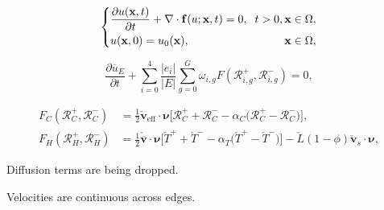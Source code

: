 \documentclass[usenames,dvipsnames,letterpaper,landscape,final]{slides}
\begin{document}
\begin{myslide}
\begin{equation*}\label{eq:conservationlaw}
		  \left \{
		  \begin{alignedat}{2}
					 &\frac{\partial u(\mathbf{x},t)}{\partial t} + \nabla \cdot \mathbf{f}(u; \mathbf{x},t) = 0, \hspace{0.2cm} t>0,\, &&\mathbf{x} \in \Omega, \\ 
					 &u(\mathbf{x},0) = u_0(\mathbf{x}), \hspace{2.5cm} &&\mathbf{x} \in \Omega,
		  \end{alignedat}
		  \right .
\end{equation*}

\begin{equation*}\label{eq:fvdis}
		  \frac{\partial \overline{u}_{E}}{\partial t} + \sum_{i=0}^4\frac{\lvert e_i \rvert}{\lvert E \rvert}
		  \sum_{g=0}^G \omega_{i,g} F(\mathcal{R}_{i,g}^+, \mathcal{R}_{i,g}^-) = 0,
\end{equation*}

\bigskip

\begin{equation*}
\label{eq:numflux}
\begin{aligned}
		  F_C(\mathcal{R}^+_C, \mathcal{R}^-_C) &= \frac{1}{2}\check{\mathbf{v}}_{\text{eff}}\cdot \pmb{\nu}
		  \Big[\mathcal{R}^+_C + \mathcal{R}^-_C - \alpha_C\big(\mathcal{R}^+_C - \mathcal{R}^-_C\big)\Big],\\
		  F_H(\mathcal{R}^+_H, \mathcal{R}^-_H) &= 
		  \frac{1}{2}\check{\overline{\mathbf{v}}}\cdot \pmb{\nu}
		  \Big[\check{T}^+ + \check{T}^- - \alpha_T \big(\check{T}^+ - \check{T}^-\big)  \Big] - \check{L} (1-\phi)\check{\mathbf{v}}_s\cdot\pmb{\nu},
\end{aligned}
\end{equation*}

		  \begin{blist}
		  \item Diffusion terms are being dropped.
		  \item Velocities are continuous across edges.
		  \end{blist}

\end{myslide}
\end{document}
